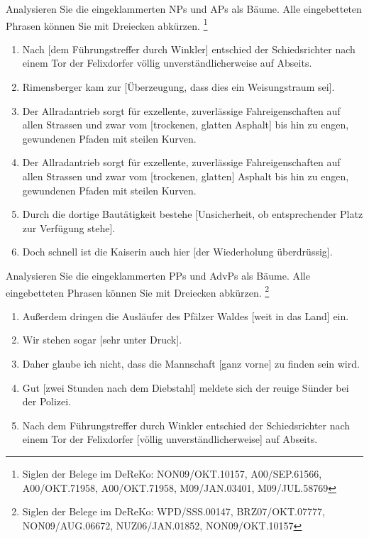 \begin{sloppypar}

\Uebung \label{u111} Analysieren Sie die eingeklammerten NPs und APs als Bäume.
Alle eingebetteten Phrasen können Sie mit Dreiecken abkürzen.%
\footnote{Siglen der Belege im DeReKo: NON09\slash OKT.10157, A00\slash SEP.61566, A00\slash OKT.71958, A00\slash OKT.71958, M09\slash JAN.03401, M09\slash JUL.58769}

\begin{enumerate}\Lf
  \item Nach [dem Führungstreffer durch Winkler] entschied der Schiedsrichter nach einem Tor der Felixdorfer völlig unverständlicherweise auf Abseits.
  \item Rimensberger kam zur [Überzeugung, dass dies ein Weisungstraum sei].
  \item Der Allradantrieb sorgt für exzellente, zuverlässige Fahreigenschaften auf allen Strassen und zwar vom [trockenen, glatten Asphalt] bis hin zu engen, gewundenen Pfaden mit steilen Kurven.
  \item Der Allradantrieb sorgt für exzellente, zuverlässige Fahreigenschaften auf allen Strassen und zwar vom [trockenen, glatten] Asphalt bis hin zu engen, gewundenen Pfaden mit steilen Kurven.
  \item Durch die dortige Bautätigkeit bestehe [Unsicherheit, ob entsprechender Platz zur Verfügung stehe].
  \item Doch schnell ist die Kaiserin auch hier [der Wiederholung überdrüssig].
\end{enumerate}

\Uebung \label{u112} Analysieren Sie die eingeklammerten PPs und AdvPs als Bäume.
Alle eingebetteten Phrasen können Sie mit Dreiecken abkürzen.%
\footnote{Siglen der Belege im DeReKo: WPD\slash SSS.00147, BRZ07\slash OKT.07777, NON09\slash AUG.06672, NUZ06\slash JAN.01852, NON09\slash OKT.10157}

\begin{enumerate}\Lf
  \item Außerdem dringen die Ausläufer des Pfälzer Waldes [weit in das Land] ein.
  \item Wir stehen sogar [sehr unter Druck].
  \item Daher glaube ich nicht, dass die Mannschaft [ganz vorne] zu finden sein wird.
  \item Gut [zwei Stunden nach dem Diebstahl] meldete sich der reuige Sünder bei der Polizei.
  \item Nach dem Führungstreffer durch Winkler entschied der Schiedsrichter nach einem Tor der Felixdorfer [völlig unverständlicherweise] auf Abseits.
\end{enumerate}


\end{sloppypar}
